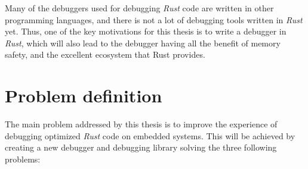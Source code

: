Many of the debuggers used for debugging \emph{Rust} code are written in other programming languages, and there is not a lot of debugging tools written in \emph{Rust} yet.
Thus, one of the key motivations for this thesis is to write a debugger in \emph{Rust}, which will also lead to the debugger having all the benefit of memory safety, and the excellent ecosystem that Rust provides.




\section{Problem definition} \label{sec:problemDef}
 

The main problem addressed by this thesis is to improve the experience of debugging optimized \emph{Rust} code on embedded systems.
This will be achieved by creating a new debugger and debugging library solving the three following problems:

